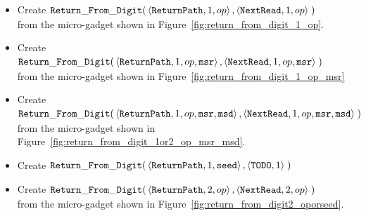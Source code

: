 \begin{itemize}

    \item Create
    $\begin{aligned}[t]
        {\tt Return\_From\_Digit}(& \left\langle {\tt ReturnPath}, 1, op \right\rangle,
                           \left\langle {\tt NextRead},        1, op \right\rangle \;)
    \end{aligned}$\\from the micro-gadget shown in Figure~\ref{fig:return_from_digit_1_op}.

    \item Create
    $\begin{aligned}[t]
        {\tt Return\_From\_Digit}(& \left\langle {\tt ReturnPath}, 1, op, {\tt msr} \right\rangle,
                           \left\langle {\tt NextRead},        1, op, {\tt msr} \right\rangle \;)
    \end{aligned}$\\from the micro-gadget shown in Figure~\ref{fig:return_from_digit_1_op_msr}

    \item Create
    $\begin{aligned}[t]
        {\tt Return\_From\_Digit}(& \left\langle {\tt ReturnPath}, 1, op, {\tt msr}, {\tt msd} \right\rangle,
                           \left\langle {\tt NextRead},        1, op, {\tt msr}, {\tt msd} \right\rangle \;)
    \end{aligned}$\\from the micro-gadget shown in Figure~\ref{fig:return_from_digit_1or2_op_msr_msd}.

    \item Create
    $\begin{aligned}[t]
        {\tt Return\_From\_Digit}(& \left\langle {\tt ReturnPath}, 1, {\tt seed}\right\rangle,
                           \left\langle {\tt TODO},  1            \right\rangle \;)
    \end{aligned}$



    \item Create
    $\begin{aligned}[t]
        {\tt Return\_From\_Digit}(& \left\langle {\tt ReturnPath},    2, op \right\rangle,
                           \left\langle {\tt NextRead}, 2, op \right\rangle \;)
    \end{aligned}$\\from the micro-gadget shown in Figure~\ref{fig:return_from_digit2_oporseed}.


\end{itemize}
